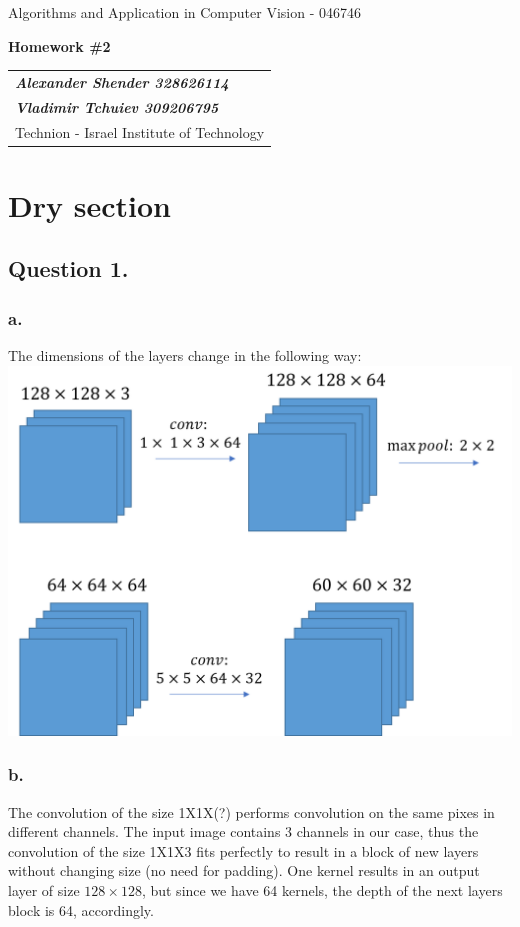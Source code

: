 \documentclass[a4paper]{iacas}
\begin{document}
\begin{center}
 \large Algorithms and Application in Computer Vision - 046746
 \end{center}
\begin{center}
\large\textbf{Homework \#2}
 \end{center}


\begin{tabular}{l}
\\
{\bf\textit{Alexander Shender 328626114}} \\
{\bf\textit{Vladimir Tchuiev 309206795}} \\
Technion - Israel Institute of Technology
\end{tabular}


\newpage

\section{Dry section}

\subsection{Question 1.}
\subsubsection{a.}

The dimensions of the layers change in the following way:
\newline
\includegraphics[scale=0.7]{imgs/q_1_1.png}
\newline
\subsubsection{b.}
The convolution of the size 1X1X(?) performs convolution on the same pixes in different channels. The input image contains 3 channels in our case, thus the convolution of the size 1X1X3 fits perfectly to result in a block of new layers without changing size (no need for padding). One kernel results in an output layer of size $128\times128$, but since we have 64 kernels, the depth of the next layers block is 64, accordingly.
\end{document}
